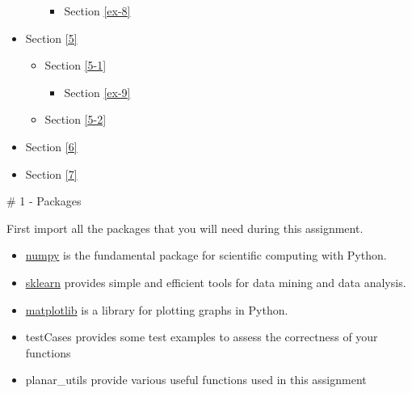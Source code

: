 \documentclass[11pt]{article}
\providecommand{\tightlist}{%
      \setlength{\itemsep}{0pt}\setlength{\parskip}{0pt}}
\begin{document}
\begin{itemize}
\begin{itemize}
    \begin{itemize}
    \tightlist
    \item
      Section \ref{ex-8}
    \end{itemize}
  \end{itemize}
\item
  Section \ref{5}

  \begin{itemize}
  \tightlist
  \item
    Section \ref{5-1}

    \begin{itemize}
    \tightlist
    \item
      Section \ref{ex-9}
    \end{itemize}
  \item
    Section \ref{5-2}
  \end{itemize}
\item
  Section \ref{6}
\item
  Section \ref{7}
\end{itemize}

    \# 1 - Packages

First import all the packages that you will need during this assignment.

\begin{itemize}
\tightlist
\item
  \href{https://www.numpy.org/}{numpy} is the fundamental package for
  scientific computing with Python.
\item
  \href{http://scikit-learn.org/stable/}{sklearn} provides simple and
  efficient tools for data mining and data analysis.
\item
  \href{http://matplotlib.org}{matplotlib} is a library for plotting
  graphs in Python.
\item
  testCases provides some test examples to assess the correctness of
  your functions
\item
  planar\_utils provide various useful functions used in this assignment
\end{itemize}
\end{document}
